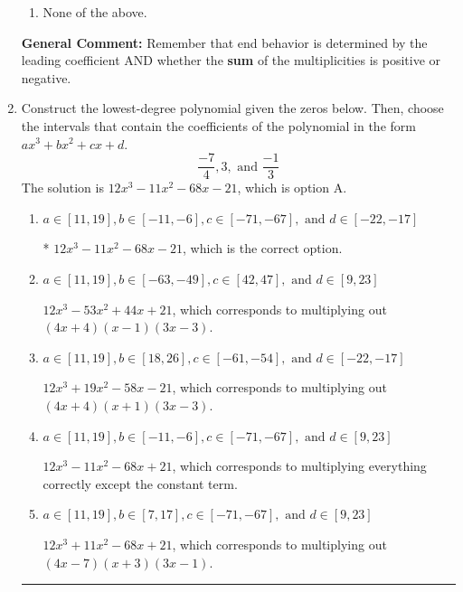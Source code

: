 \documentclass{extbook}[14pt]
\newcommand{\litem}[1]{\item #1

\rule{\textwidth}{0.4pt}}
\begin{document}
\begin{enumerate}
{\begin{enumerate}[label=\Alph*.]
\item None of the above.\end{enumerate}
\textbf{General Comment:} Remember that end behavior is determined by the leading coefficient AND whether the \textbf{sum} of the multiplicities is positive or negative.
}
\litem{
Construct the lowest-degree polynomial given the zeros below. Then, choose the intervals that contain the coefficients of the polynomial in the form $ax^3+bx^2+cx+d$.
\[ \frac{-7}{4}, 3, \text{ and } \frac{-1}{3} \]
The solution is \( 12x^{3} -11 x^{2} -68 x -21 \), which is option A.\begin{enumerate}[label=\Alph*.]
\item \( a \in [11, 19], b \in [-11, -6], c \in [-71, -67], \text{ and } d \in [-22, -17] \)

* $12x^{3} -11 x^{2} -68 x -21$, which is the correct option.
\item \( a \in [11, 19], b \in [-63, -49], c \in [42, 47], \text{ and } d \in [9, 23] \)

$12x^{3} -53 x^{2} +44 x + 21$, which corresponds to multiplying out $(4x + 4)(x -1)(3x -3)$.
\item \( a \in [11, 19], b \in [18, 26], c \in [-61, -54], \text{ and } d \in [-22, -17] \)

$12x^{3} +19 x^{2} -58 x -21$, which corresponds to multiplying out $(4x + 4)(x + 1)(3x -3)$.
\item \( a \in [11, 19], b \in [-11, -6], c \in [-71, -67], \text{ and } d \in [9, 23] \)

$12x^{3} -11 x^{2} -68 x + 21$, which corresponds to multiplying everything correctly except the constant term.
\item \( a \in [11, 19], b \in [7, 17], c \in [-71, -67], \text{ and } d \in [9, 23] \)

$12x^{3} +11 x^{2} -68 x + 21$, which corresponds to multiplying out $(4x -7)(x + 3)(3x -1)$.
\end{enumerate}

}
\end{enumerate}
\end{document}
